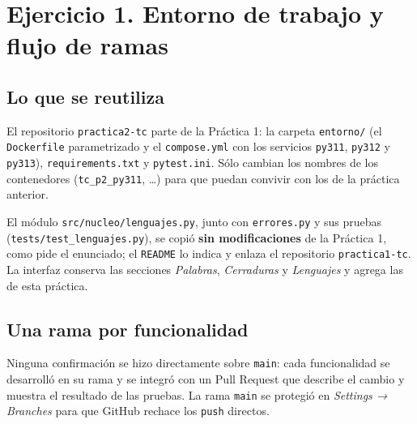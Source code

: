 \hypertarget{ejercicio-1.-entorno-de-trabajo-y-flujo-de-ramas}{%
\section{Ejercicio 1. Entorno de trabajo y flujo de ramas}\label{ejercicio-1.-entorno-de-trabajo-y-flujo-de-ramas}}

\hypertarget{lo-que-se-reutiliza}{%
\subsection{Lo que se reutiliza}\label{lo-que-se-reutiliza}}

El repositorio \texttt{practica2-tc} parte de la Práctica 1: la carpeta \texttt{entorno/} (el \texttt{Dockerfile} parametrizado y el \texttt{compose.yml} con los servicios \texttt{py311}, \texttt{py312} y \texttt{py313}), \texttt{requirements.txt} y \texttt{pytest.ini}. Sólo cambian los nombres de los contenedores (\texttt{tc\_p2\_py311}, \ldots) para que puedan convivir con los de la práctica anterior.

El módulo \texttt{src/nucleo/lenguajes.py}, junto con \texttt{errores.py} y sus pruebas (\texttt{tests/test\_lenguajes.py}), se copió \textbf{sin modificaciones} de la Práctica 1, como pide el enunciado; el \texttt{README} lo indica y enlaza el repositorio \texttt{practica1-tc}. La interfaz conserva las secciones \emph{Palabras}, \emph{Cerraduras} y \emph{Lenguajes} y agrega las de esta práctica.

\hypertarget{una-rama-por-funcionalidad}{%
\subsection{Una rama por funcionalidad}\label{una-rama-por-funcionalidad}}

Ninguna confirmación se hizo directamente sobre \texttt{main}: cada funcionalidad se desarrolló en su rama y se integró con un Pull Request que describe el cambio y muestra el resultado de las pruebas. La rama \texttt{main} se protegió en \emph{Settings → Branches} para que GitHub rechace los \texttt{push} directos.

